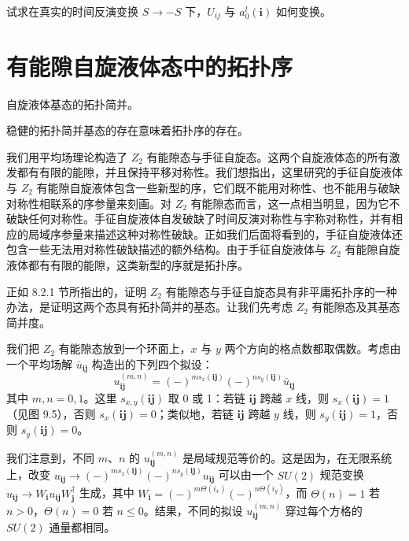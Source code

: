 试求在真实的时间反演变换 $S\to-S$ 下，$U_{ij}$ 与 $a_0^l(\pmb{i})$ 如何变换。

\section{有能隙自旋液体态中的拓扑序}

\begin{keypoints}
\item 自旋液体基态的拓扑简并。
\item 稳健的拓扑简并基态的存在意味着拓扑序的存在。
\end{keypoints}

我们用平均场理论构造了 $Z_2$ 有能隙态与手征自旋态。这两个自旋液体态的所有激发都有有限的能隙，并且保持平移对称性。我们想指出，这里研究的手征自旋液体与 $Z_2$ 有能隙自旋液体包含一些新型的序，它们既不能用对称性、也不能用与破缺对称性相联系的序参量来刻画。对 $Z_2$ 有能隙态而言，这一点相当明显，因为它不破缺任何对称性。手征自旋液体自发破缺了时间反演对称性与宇称对称性，并有相应的局域序参量来描述这种对称性破缺。正如我们后面将看到的，手征自旋液体还包含一些无法用对称性破缺描述的额外结构。由于手征自旋液体与 $Z_2$ 有能隙自旋液体都有有限的能隙，这类新型的序就是拓扑序。

正如 8.2.1 节所指出的，证明 $Z_2$ 有能隙态与手征自旋态具有非平庸拓扑序的一种办法，是证明这两个态具有拓扑简并的基态。让我们先考虑 $Z_2$ 有能隙态及其基态简并度。

我们把 $Z_2$ 有能隙态放到一个环面上，$x$ 与 $y$ 两个方向的格点数都取偶数。考虑由一个平均场解 $\bar{u}_{\pmb{ij}}$ 构造出的下列四个拟设：
\begin{equation*}
u_{\pmb{ij}}^{(m,n)}=(-)^{m s_x(\pmb{ij})}(-)^{n s_y(\pmb{ij})}\bar{u}_{\pmb{ij}}
\tag{9.3.1}
\end{equation*}
其中 $m,n=0,1$。这里 $s_{x,y}(\pmb{ij})$ 取 0 或 1：若链 $\pmb{ij}$ 跨越 $x$ 线，则 $s_x(\pmb{ij})=1$（见图 9.5），否则 $s_x(\pmb{ij})=0$；类似地，若链 $\pmb{ij}$ 跨越 $y$ 线，则 $s_y(\pmb{ij})=1$，否则 $s_y(\pmb{ij})=0$。

我们注意到，不同 $m$、$n$ 的 $u_{\pmb{ij}}^{(m,n)}$ 是局域规范等价的。这是因为，在无限系统上，改变 $u_{\pmb{ij}}\to(-)^{m s_x(\pmb{ij})}(-)^{n s_y(\pmb{ij})}u_{\pmb{ij}}$ 可以由一个 $SU(2)$ 规范变换 $u_{\pmb{ij}}\to W_{\pmb{i}}u_{\pmb{ij}}W_{\pmb{j}}^{\dagger}$ 生成，其中 $W_{\pmb{i}}=(-)^{m\Theta(i_x)}(-)^{n\Theta(i_y)}$，而 $\Theta(n)=1$ 若 $n>0$，$\Theta(n)=0$ 若 $n\leqslant0$。结果，不同的拟设 $u_{\pmb{ij}}^{(m,n)}$ 穿过每个方格的 $SU(2)$ 通量都相同。

